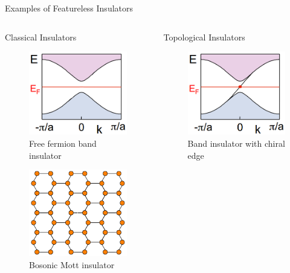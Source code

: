 \begin{frame}{Examples of Featureless Insulators}
\vskip-1.5cm			
\begin{columns}[T]
\begin{column}[T]{.5\textwidth}
		\begin{block}{Classical Insulators}
			\vskip-0.3cm
	  	\begin{figure}
				\includegraphics[width=0.5\linewidth]{diagrams/band_insulator.png}
				\caption{Free fermion band insulator}
			\end{figure}
			\begin{figure}
			\vskip-0.5cm
				\includegraphics[width=0.5\linewidth]{diagrams/filled_honeycomb.pdf}
				\caption{Bosonic Mott insulator}
			\end{figure}
		\end{block}
\end{column}
\begin{column}[T]{.5\textwidth}
	\begin{block}{Topological Insulators}
		\vskip-0.3cm
		\begin{figure}
			\includegraphics[width=0.5\linewidth]{diagrams/chiral_edge.png}
			\caption{Band insulator with chiral edge \footnotemark}
		\end{figure}
	\end{block}

\end{column}
\end{columns}
\end{frame}

